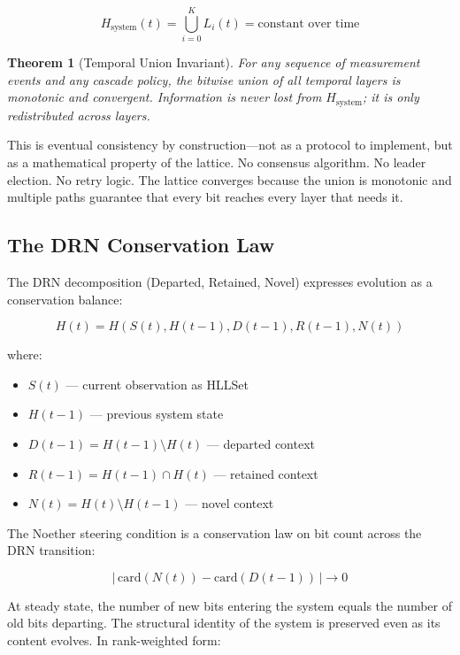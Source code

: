 \documentclass[11pt,a4paper]{article}
\newtheorem{theorem}{Theorem}[section]
\theoremstyle{remark}
\begin{document}
\begin{equation}
  H_{\text{system}}(t) = \bigcup_{i=0}^{K} L_i(t) = \text{constant over time}
\end{equation}

\begin{theorem}[Temporal Union Invariant]
\label{thm:union}
For any sequence of measurement events and any cascade policy, the bitwise union of all
temporal layers is monotonic and convergent. Information is never lost from
$H_{\text{system}}$; it is only redistributed across layers.
\end{theorem}

This is eventual consistency by construction---not as a protocol to implement, but as a
mathematical property of the lattice. No consensus algorithm. No leader election. No
retry logic. The lattice converges because the union is monotonic and multiple paths
guarantee that every bit reaches every layer that needs it.

\subsection{The DRN Conservation Law}

The DRN decomposition (Departed, Retained, Novel) expresses evolution as a conservation
balance:

\begin{equation}
  H(t) = H(S(t), H(t-1), D(t-1), R(t-1), N(t))
\end{equation}

where:
\begin{itemize}[leftmargin=*,nosep]
  \item $S(t)$ --- current observation as HLLSet
  \item $H(t-1)$ --- previous system state
  \item $D(t-1) = H(t-1) \setminus H(t)$ --- departed context
  \item $R(t-1) = H(t-1) \cap H(t)$ --- retained context
  \item $N(t) = H(t) \setminus H(t-1)$ --- novel context
\end{itemize}

The Noether steering condition is a conservation law on bit count across the DRN
transition:

\begin{equation}
  |\,\text{card}(N(t)) - \text{card}(D(t-1))\,| \to 0
\end{equation}

At steady state, the number of new bits entering the system equals the number of old
bits departing. The structural identity of the system is preserved even as its content
evolves. In rank-weighted form:
\end{document}

